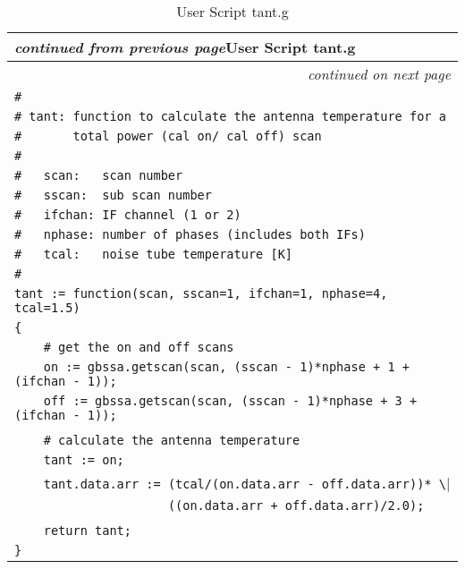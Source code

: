 \setlongtables
\begin{longtable}[c]{|l|}
\caption{User Script tant.g}\label{tant} \\
\cline{1-1}
\endfirsthead
\multicolumn{1}{l}{\hspace{9mm}\footnotesize{\slshape
 continued from previous page}\hfill{User Script tant.g}} \\
\cline{1-1}
\endhead
\cline{1-1}
\multicolumn{1}{r}{\small \slshape
 continued on next page} \\
\endfoot
\cline{1-1}
\endlastfoot
{\slshape\small}
\verb|#| \\
\verb|# tant: function to calculate the antenna temperature for a | \\
\verb|#       total power (cal on/ cal off) scan | \\ 
\verb|#   | \\
\verb|#   scan:   scan number| \\
\verb|#   sscan:  sub scan number | \\
\verb|#   ifchan: IF channel (1 or 2)| \\
\verb|#   nphase: number of phases (includes both IFs)| \\
\verb|#   tcal:   noise tube temperature [K]| \\
\verb|#| \\
\verb|tant := function(scan, sscan=1, ifchan=1, nphase=4, tcal=1.5)| \\
\verb|{| \\
\verb|    # get the on and off scans| \\
\verb|    on := gbssa.getscan(scan, (sscan - 1)*nphase + 1 + (ifchan - 1));| \\
\verb|    off := gbssa.getscan(scan, (sscan - 1)*nphase + 3 + (ifchan - 1));| \\
\verb|| \\
\verb|    # calculate the antenna temperature| \\
\verb|    tant := on;| \\
\verb|    tant.data.arr := (tcal/(on.data.arr - off.data.arr))* \| \\
\verb|                     ((on.data.arr + off.data.arr)/2.0);| \\
\verb|| \\
\verb|    return tant;| \\
\verb|}| \\
\end{longtable}
